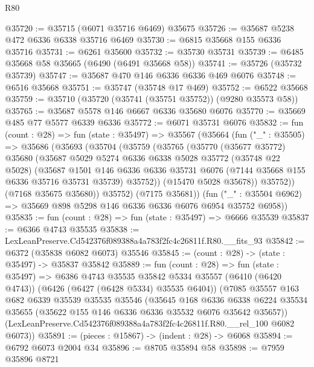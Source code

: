 \begin{lexlean}{R80}
\begin{coremodule}
@35720 := @35715 (@6071 @35716 @6469) @35675
@35726 := @35687 @5238 @472 @6336 @6338 @35716 @6469
@35730 := @6815 @35668 @155 @6336 @35716
@35731 := @6261 @35600
@35732 := @35730 @35731
@35739 := @6485 @35668 @58 @35665 (@6490 (@6491 @35668 @58))
@35741 := @35726 (@35732 @35739)
@35747 := @35687 @470 @146 @6336 @6336 @469 @6076
@35748 := @6516 @35668
@35751 := @35747 (@35748 @17 @469)
@35752 := @6522 @35668
@35759 := @35710 (@35720 (@35741 (@35751 @35752)) (@9280 @35573 @58))
@35765 := @35687 @5578 @146 @6667 @6336 @35680 @6076
@35770 := @35669 @485 @77 @5577 @6339 @6336
@35772 := @6071 @35731 @6076
@35832 := fun (count : @28) =>
  fun (state : @35497) =>
  @35567
    (@35664
      (fun ("_" : @35505) =>
      @35686
        (@35693
          (@35704
            (@35759
              (@35765
                (@35770
                  (@35677 @35772)
                  @35680
                  (@35687
                    @5029
                    @5274
                    @6336
                    @6338
                    @5028
                    @35772
                    (@35748 @22 @5028)
                    (@35687
                      @1501
                      @146
                      @6336
                      @6336
                      @35731
                      @6076
                      (@7144 @35668 @155 @6336 @35716 @35731 @35739)
                      @35752))
                  (@15470 @5028 @35678))
                @35752))
            (@7168 @35675 @35680))
          @35752)
        (@7175 @35681))
      (fun ("_" : @35504 @6962) => @35669 @898 @5298 @146 @6336 @6336 @6076 @6954 @35752 @6958))
@35835 := fun (count : @28) => fun (state : @35497) => @6666 @35539
@35837 := @6366 @4743 @35535
@35838 := LexLeanPreserve.Cd542376f089388a4a783f2fc4c26811f.R80.__fits_93
@35842 := @6372 (@35838 @6082 @6073) @35546
@35845 := (count : @28) -> (state : @35497) -> @35837 @35842
@35889 := fun (count : @28) =>
  fun (state : @35497) =>
  @6386
    @4743
    @35535
    @35842
    @5334
    @35557
    (@6410 (@6420 @4743))
    (@6426 (@6427 (@6428 @5334) @35535 @6404))
    (@7085
      @35557
      @163
      @682
      @6339
      @35539
      @35535
      @35546
      (@35645
        @168
        @6336
        @6338
        @6224
        @35534
        @35655
        (@35622 @155 @146 @6336 @6336 @35532 @6076 @35642 @35657))
      (LexLeanPreserve.Cd542376f089388a4a783f2fc4c26811f.R80.__rel_100 @6082 @6073))
@35891 := (pieces : @15867) -> (indent : @28) -> @6068
@35894 := @6792 @6073 @2004 @34
@35896 := @8705 @35894 @58
@35898 := @7959 @35896 @8721

\end{coremodule}
\end{lexlean}
